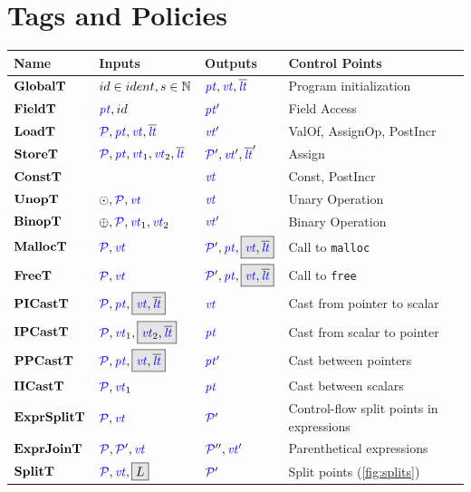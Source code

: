 \documentclass[acmsmall,review,anonymous]{acmart}\settopmatter{printfolios=true,printccs=false,printacmref=false}
\begin{document}
\section{Tags and Policies}

\begin{table}
  \begin{tabular}{|l|l|l|l|}
    \hline
    Name & Inputs & Outputs & Control Points \\
    \hline
    \(\globaltname\)    & \(\globaltargstyped\)  & \(\globaltres\)    & Program initialization \\
    \(\fieldtname\)     & \(\fieldtargs\)        & \(\fieldtres\)     & Field Access \\
    \(\loadtname\)      & \(\loadtargs\)         & \(\loadtres\)      & ValOf, AssignOp, PostIncr \\
    \(\storetname\)     & \(\storetargs\)        & \(\storetres\)     & Assign \\
    \(\consttname\)     &                        & \(\consttres\)     & Const, PostIncr \\
    \(\unoptname\)      & \(\unoptargs\)         & \(\unoptres\)      & Unary Operation \\
    \(\binoptname\)     & \(\binoptargs\)        & \(\binoptres\)     & Binary Operation \\
    \(\malloctname\)    & \(\malloctargs\)       & \(\malloctres\)    & Call to {\tt malloc} \\
    \(\freetname\)      & \(\freetargs\)         & \(\freetres\)      & Call to {\tt free} \\
    \(\picasttname\)    & \(\picasttargs\)       & \(\picasttres\)    & Cast from pointer to scalar \\
    \(\ipcasttname\)    & \(\ipcasttargs\)       & \(\ipcasttres\)    & Cast from scalar to pointer \\
    \(\ppcasttname\)    & \(\ppcasttargs\)       & \(\ppcasttres\)    & Cast between pointers \\
    \(\iicasttname\)    & \(\iicasttargs\)       & \(\iicasttres\)    & Cast between scalars \\
    \(\exprsplittname\) & \(\exprsplittargs\)    & \(\exprsplittres\) & Control-flow split points in expressions \\
    \(\exprjointname\)  & \(\exprjointargs\)     & \(\exprjointres\)  & Parenthetical expressions \\
    \(\splittname\)     & \(\splittargs\)        & \(\splittres\)     & Split points (\cref{fig:splits})\\

\end{tabular}
\end{table}
\end{document}
